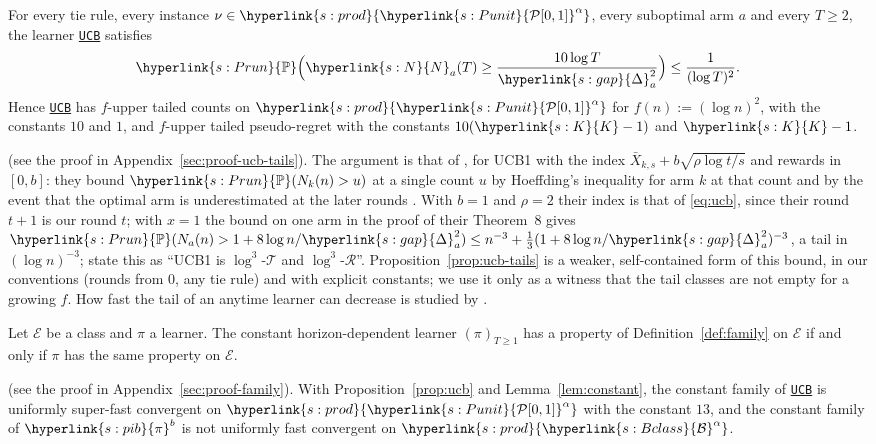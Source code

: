 \documentclass[11pt]{article}
\newcommand{\Prob}{\mathbb{P}}
\newcommand{\sy}[2]{{\hyperlink{#1}{#2}}}
\newcommand{\Punit}{\sy{s:Punit}{\mathcal{P}[0,1]}}
\newcommand{\Bclass}{\sy{s:Bclass}{\mathcal{B}}}
\newcommand{\Karms}{\sy{s:K}{K}}
\newcommand{\gap}{\sy{s:gap}{\Delta}}
\newcommand{\powc}[1]{\sy{s:prod}{#1^{\alpha}}}
\newcommand{\Pru}{\sy{s:Prun}{\Prob}}
\newcommand{\Np}{\sy{s:N}{N}}
\newcommand{\Cons}{\sy{s:pib}{\pi}}
\newcommand{\ucb}{\hyperref[alg:ucb]{\texttt{UCB}}}
\begin{document}
\begin{proposition}\label{prop:ucb-tails}
For every tie rule, every instance $\nu\in\powc{\Punit}$, every suboptimal arm $a$ and every
$T\ge2$, the learner \ucb{} satisfies
\begin{equation*}
  \Pru\Big(\Np_a(T)\ge\frac{10\log T}{\gap_a^2}\Big)\le\frac{1}{(\log T)^2}.
\end{equation*}
Hence \ucb{} has $f$-upper tailed counts on $\powc{\Punit}$ for $f(n):=(\log n)^2$, with the
constants $10$ and $1$, and $f$-upper tailed pseudo-regret with the constants $10(\Karms-1)$ and
$\Karms-1$.
\end{proposition}
(see the proof in Appendix~\ref{sec:proof-ucb-tails}). The argument is that of
\citet[Theorem~8 and its proof]{AMS09}, for UCB1 with the index
$\bar X_{k,s}+b\sqrt{\rho\log t/s}$ and rewards in $[0,b]$: they bound
$\Pru(N_k(n)>u)$ at a single count $u$ by Hoeffding's inequality for arm $k$ at that count and by the
event that the optimal arm is underestimated at the later rounds \citep[Theorem~2, (12)]{AMS09}. With
$b=1$ and $\rho=2$ their index is that of \eqref{eq:ucb}, since their round $t+1$ is our round $t$;
with $x=1$ the bound on one arm in the proof of their Theorem~8 gives $\Pru(N_a(n)>1+8\log n/\gap_a^2)\le n^{-3}+\frac13(1+8\log n/\gap_a^2)^{-3}$, a
tail in $(\log n)^{-3}$; \citet[Section~2]{SA11} state this as ``UCB1 is $\log^3$-$\mathcal T$ and
$\log^3$-$\mathcal R$''. Proposition~\ref{prop:ucb-tails} is a weaker, self-contained form of this
bound, in our conventions (rounds from $0$, any tie rule) and with explicit constants; we use it only as a
witness that the tail classes are not empty for a growing $f$. How fast the tail of an anytime
learner can decrease is studied by \citet{SA11}.

\begin{lemma}\label{lem:family}
Let $\mathcal E$ be a class and $\pi$ a learner. The constant horizon-dependent learner
$(\pi)_{T\ge1}$ has a property of Definition~\ref{def:family} on $\mathcal E$ if and only if $\pi$ has
the same property on $\mathcal E$.
\end{lemma}
(see the proof in Appendix~\ref{sec:proof-family}). With Proposition~\ref{prop:ucb} and
Lemma~\ref{lem:constant}, the constant family of \ucb{} is uniformly super-fast convergent on
$\powc{\Punit}$ with the constant $13$, and the constant family of $\Cons^b$ is not uniformly fast
convergent on $\powc{\Bclass}$.
\end{document}
